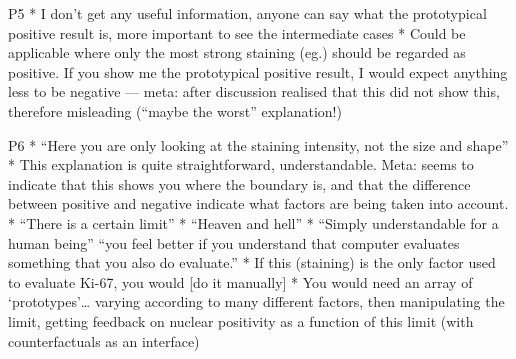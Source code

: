 

P5
* I don’t get any useful information, anyone can say what the prototypical positive result is, more important to see the intermediate cases
* Could be applicable where only the most strong staining (eg.) should be regarded as positive. If you show me the prototypical positive result, I would expect anything less to be negative — meta: after discussion realised that this did not show this, therefore misleading (“maybe the worst” explanation!)

P6
* “Here you are only looking at the staining intensity, not the size and shape”
* This explanation is quite straightforward, understandable. Meta: seems to indicate that this shows you where the boundary is, and that the difference between positive and negative indicate what factors are being taken into account. 
* “There is a certain limit”
* “Heaven and hell”
* “Simply understandable for a human being” “you feel better if you understand that computer evaluates something that you also do evaluate.”
* If this (staining) is the only factor used to evaluate Ki-67, you would [do it manually]
* You would need an array of ‘prototypes’… varying according to many different factors, then manipulating the limit, getting feedback on nuclear positivity as a function of this limit (with counterfactuals as an interface)

